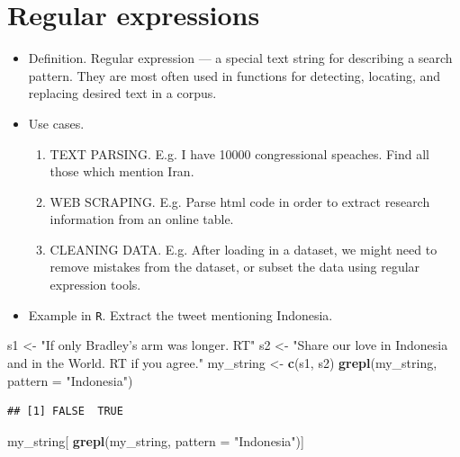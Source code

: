 \documentclass[]{book}
\newenvironment{Shaded}{\begin{snugshade}}{\end{snugshade}}
\newcommand{\KeywordTok}[1]{\textcolor[rgb]{0.13,0.29,0.53}{\textbf{#1}}}
\newcommand{\DataTypeTok}[1]{\textcolor[rgb]{0.13,0.29,0.53}{#1}}
\newcommand{\StringTok}[1]{\textcolor[rgb]{0.31,0.60,0.02}{#1}}
\newcommand{\NormalTok}[1]{#1}
\providecommand{\tightlist}{%
  \setlength{\itemsep}{0pt}\setlength{\parskip}{0pt}}
\theoremstyle{definition}
\theoremstyle{definition}
\theoremstyle{definition}
\theoremstyle{remark}
\begin{document}
\section{Regular expressions}\label{regular-expressions}

\begin{itemize}
\item
  Definition. Regular expression --- a special text string for
  describing a search pattern. They are most often used in functions for
  detecting, locating, and replacing desired text in a corpus.
\item
  Use cases.

  \begin{enumerate}
  \def\labelenumi{\arabic{enumi}.}
  \tightlist
  \item
    TEXT PARSING. E.g. I have 10000 congressional speaches. Find all
    those which mention Iran.
  \item
    WEB SCRAPING. E.g. Parse html code in order to extract research
    information from an online table.
  \item
    CLEANING DATA. E.g. After loading in a dataset, we might need to
    remove mistakes from the dataset, or subset the data using regular
    expression tools.
  \end{enumerate}
\item
  Example in \texttt{R}. Extract the tweet mentioning Indonesia.
\end{itemize}

\begin{Shaded}
\begin{Highlighting}[]
\NormalTok{s1 <-}\StringTok{ "If only Bradley's arm was longer. RT"}
\NormalTok{s2 <-}\StringTok{ "Share our love in Indonesia and in the World. RT if you agree."} 
\NormalTok{my_string <-}\StringTok{ }\KeywordTok{c}\NormalTok{(s1, s2)}
\KeywordTok{grepl}\NormalTok{(my_string, }\DataTypeTok{pattern =} \StringTok{"Indonesia"}\NormalTok{)}
\end{Highlighting}
\end{Shaded}

\begin{verbatim}
## [1] FALSE  TRUE
\end{verbatim}

\begin{Shaded}
\begin{Highlighting}[]
\NormalTok{my_string[ }\KeywordTok{grepl}\NormalTok{(my_string, }\DataTypeTok{pattern =} \StringTok{"Indonesia"}\NormalTok{)]}
\end{Highlighting}
\end{Shaded}
\end{document}
